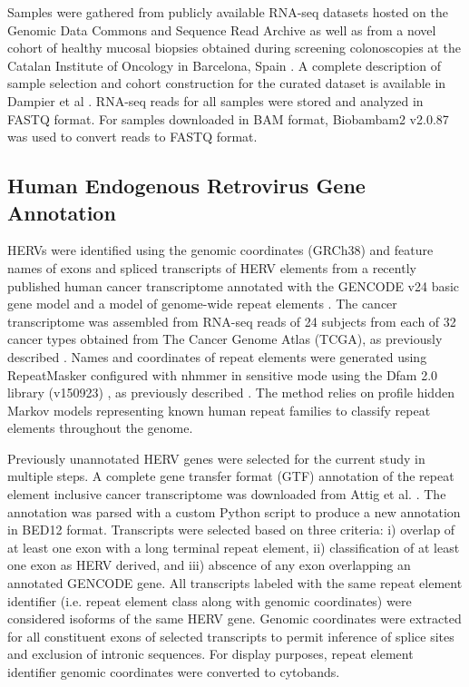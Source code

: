 \documentclass[10pt,letterpaper]{article}
\begin{document}
Samples were gathered from publicly available RNA-seq datasets hosted on the Genomic Data Commons and Sequence Read Archive as well as from a novel cohort of healthy mucosal biopsies obtained during screening colonoscopies at the Catalan Institute of Oncology in Barcelona, Spain \cite{Dampier2020, Diez-Obrero2020}.
A complete description of sample selection and cohort construction for the curated dataset is available in Dampier et al \cite{Dampier2020}.
RNA-seq reads for all samples were stored and analyzed in FASTQ format.
For samples downloaded in BAM format, Biobambam2 v2.0.87 \cite{Tischler2014} was used to convert reads to FASTQ format.

\subsection*{Human Endogenous Retrovirus Gene Annotation}
HERVs were identified using the genomic coordinates (GRCh38) and feature names of exons and spliced transcripts of HERV elements from a recently published human cancer transcriptome annotated with the GENCODE v24 basic gene model \cite{Frankish2018} and a model of genome-wide repeat elements \cite{Attig2019}.
The cancer transcriptome was assembled from RNA-seq reads of 24 subjects from each of 32 cancer types obtained from The Cancer Genome Atlas (TCGA), as previously described \cite{Attig2019}.
Names and coordinates of repeat elements were generated using RepeatMasker \cite{Smit2015} configured with nhmmer \cite{Wheeler2013} in sensitive mode using the Dfam 2.0 library (v150923) \cite{Hubley2015}, as previously described \cite{Attig2017}.
The method relies on profile hidden Markov models representing known human repeat families to classify repeat elements throughout the genome.

Previously unannotated HERV genes were selected for the current study in multiple steps.
A complete gene transfer format (GTF) \cite{GTF} annotation of the repeat element inclusive cancer transcriptome was downloaded from Attig et al. \cite{Attig2019}.
The annotation was parsed with a custom Python script to produce a new annotation in BED12 \cite{BED12} format.
Transcripts were selected based on three criteria: i) overlap of at least one exon with a long terminal repeat element, ii) classification of at least one exon as HERV derived, and iii) abscence of any exon overlapping an annotated GENCODE gene.
All transcripts labeled with the same repeat element identifier (i.e. repeat element class along with genomic coordinates) were considered isoforms of the same HERV gene.
Genomic coordinates were extracted for all constituent exons of selected transcripts to permit inference of splice sites and exclusion of intronic sequences.
For display purposes, repeat element identifier genomic coordinates were converted to cytobands.
\end{document}
